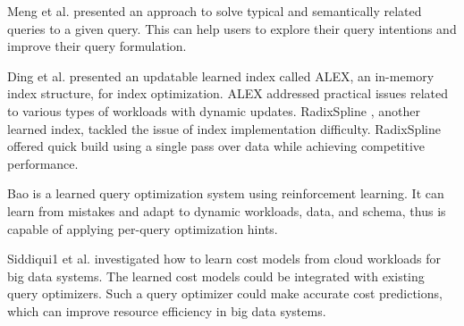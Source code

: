 \documentclass[conference]{IEEEtran}
\begin{document}
 Meng et al. \cite{meng2017top} presented an approach to solve typical and semantically related queries to a given query. This can help users to explore their query intentions and improve their query formulation.

 Ding et al. \cite{ding2020alex} presented an updatable learned index called ALEX, an in-memory index structure, for index optimization. ALEX addressed practical issues related to various types of workloads with dynamic updates. RadixSpline \cite{kipf2020radixspline}, another learned index, tackled the issue of index implementation difficulty. RadixSpline offered quick build using a single pass over data while achieving competitive performance.

 Bao \cite{marcus2022bao} is a learned query optimization system using reinforcement learning. It can learn from mistakes and adapt to dynamic workloads, data, and schema, thus is capable of applying per-query optimization hints.

 Siddiqui1 et al. \cite{siddiqui2020cost} investigated how to learn cost models from cloud workloads for big data systems. The learned cost models could be integrated with existing query optimizers. Such a query optimizer could make accurate cost predictions, which can improve resource efficiency in big data systems.




\end{document}
